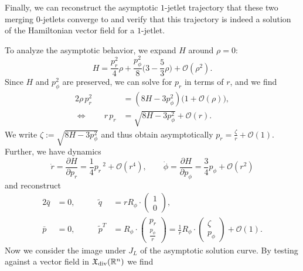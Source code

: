 \documentclass[12pt]{amsart}
\newcommand{\R}{\ensuremath{\mathbb{R}}}
\begin{document}
Finally, we can reconstruct the asymptotic $1$-jetlet trajectory that
these two merging $0$-jetlets converge to and verify that this
trajectory is indeed a solution of the Hamiltonian vector field for a
$1$-jetlet.

To analyze the asymptotic behavior, we expand $H$ around $\rho = 0$:
\begin{equation}
  H = \frac{p_r^2      }{4} \rho
     +\frac{p_\phi^2}{8}\big(3 - \frac{5}{3}\rho\big)
     +\mathcal{O}(\rho^2).
\end{equation}
Since $H$ and $p_\phi^2$ are preserved, we can solve for $p_r$ in
terms of $r$, and we find
\begin{align*}
  2\rho\,p_r^2 &= (8H - 3 p_\phi^2) \big(1 + \mathcal{O}(\rho)\big), \\
\Longleftrightarrow \qquad
      r\,p_r   &= \sqrt{8H - 3 p_\phi^2} + \mathcal{O}(r).
\end{align*}
We write $\zeta := \sqrt{8H - 3 p_\phi^2}$ and thus obtain
asymptotically $p_r = \frac{\zeta}{r} + \mathcal{O}(1)$. Further, we
have dynamics
\begin{equation}
  \dot{r} = \frac{\partial H}{\partial p_r} = \frac{1}{4}p_r\,^2 + \mathcal{O}(r^4), \qquad
  \dot{\phi} = \frac{\partial H}{\partial p_\phi}
                 = \frac{3}{4}p_\phi + \mathcal{O}(r^2)
\end{equation}
and reconstruct
\begin{alignat*}{2}
  \bar{q}   &= 0,& \qquad
  \tilde{q} &= r R_\phi \cdot\begin{pmatrix} 1 \\ 0 \end{pmatrix},\\
  \bar{p}   &= 0,& \qquad
\tilde{p}^T &= R_\phi \cdot
               \begin{pmatrix} p_r \\ \frac{p_\phi}{r} \end{pmatrix}
             = \frac{1}{r} R_\phi \cdot
               \begin{pmatrix} \zeta \\ p_\phi \end{pmatrix} + \mathcal{O}(1).
\end{alignat*}
Now we consider the image under $J_L$ of the asymptotic solution
curve. By testing against a vector field in $\mathfrak{X}_{\rm
  div}(\R^n)$ we find
\end{document}

